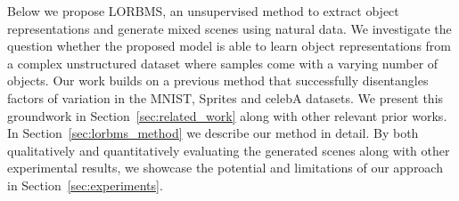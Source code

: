 \documentclass[a4paper,12pt]{report}
\begin{document}
\vspace{5mm}
Below we propose LORBMS, an unsupervised method to extract object representations and generate mixed scenes using natural data. We investigate the question whether the proposed model is able to learn object representations from a complex unstructured dataset where samples come with a varying number of objects. Our work builds on a previous method that successfully disentangles factors of variation in the MNIST, Sprites and celebA datasets. We present this groundwork in Section~\ref{sec:related_work} along with other relevant prior works. In Section~\ref{sec:lorbms_method} we describe our method in detail. By both qualitatively and quantitatively evaluating the generated scenes along with other experimental results, we showcase the potential and limitations of our approach in Section~\ref{sec:experiments}.  
\end{document}
